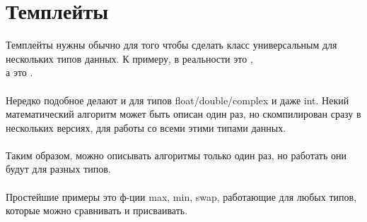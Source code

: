 \section{Темплейты}

Темплейты нужны обычно для того чтобы сделать класс универсальным для нескольких типов данных.
К примеру,  в реальности это , \\ 
а  это . \\
\\
Нередко подобное делают и для типов float/double/complex и даже int. 
Некий математический алгоритм может быть описан один раз,
но скомпилирован сразу в нескольких версиях, для работы со всеми этими типами данных. \\
\\
Таким образом, можно описывать алгоритмы только один раз, но работать они будут для разных типов. \\
\\
Простейшие примеры это ф-ции max, min, swap, работающие для любых типов, которые можно сравнивать
и присваивать.



